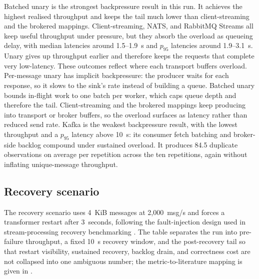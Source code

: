 Batched unary is the strongest backpressure result in this run. It achieves the highest realised throughput and keeps the tail much lower than client-streaming and the brokered mappings. Client-streaming, NATS, and RabbitMQ Streams all keep useful throughput under pressure, but they absorb the overload as queueing delay, with median latencies around 1.5--1.9~s and $p_{95}$ latencies around 1.9--3.1~s. Unary gives up throughput earlier and therefore keeps the requests that complete very low-latency. These outcomes reflect where each transport buffers overload. Per-message unary has implicit backpressure: the producer waits for each response, so it slows to the sink's rate instead of building a queue. Batched unary bounds in-flight work to one batch per worker, which caps queue depth and therefore the tail. Client-streaming and the brokered mappings keep producing into transport or broker buffers, so the overload surfaces as latency rather than reduced send rate. Kafka is the weakest backpressure result, with the lowest throughput and a $p_{95}$ latency above 10~s: its consumer fetch batching and broker-side backlog compound under sustained overload. It produces 84.5 duplicate observations on average per repetition across the ten repetitions, again without inflating unique-message throughput.

\subsection{Recovery scenario}

The recovery scenario uses 4~KiB messages at 2{,}000~msg/s and forces a transformer restart after 3~seconds, following the fault-injection design used in stream-processing recovery benchmarking \cite{vogel2024faultRecovery}. The table separates the run into pre-failure throughput, a fixed 10~s recovery window, and the post-recovery tail so that restart visibility, sustained recovery, backlog drain, and correctness cost are not collapsed into one ambiguous number; the metric-to-literature mapping is given in .

